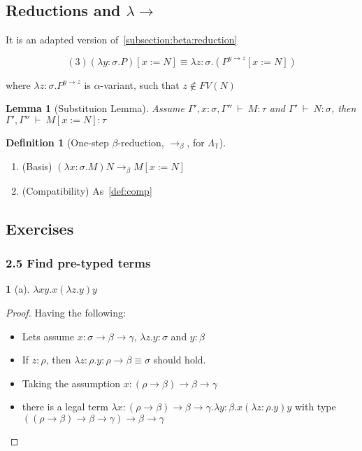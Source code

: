 \documentclass[12pt, a4paper]{article}
\newcommand{\onebeta}{\to_\beta}
\newcommand{\deriv}{\ \vdash\ }
\newtheorem{definition}{Definition}[section]
\newtheorem{lemma}{Lemma}[section]
\newtheorem*{exercise}{}
\begin{document}
\subsection{Reductions and \texorpdfstring{$\lambda\to$}{Lg}}
It is an adapted version of~\ref{subsection:beta:reduction}

\begin{equation}
    (3) (\lambda y : \sigma . P)[x := N] \equiv \lambda z : \sigma . (P^{y \to z}[x := N])
\end{equation}

where $\lambda z : \sigma. P^{y \to z}$ is $\alpha$-variant, such that $z \notin FV(N)$

\begin{lemma}[Substituion Lemma]
    Assume $\Gamma', x : \sigma, \Gamma'' \deriv M : \tau$ and $\Gamma' \deriv N : \sigma$, then $\Gamma', \Gamma'' \deriv M[x := N] : \tau$
\end{lemma}

\begin{definition}[One-step $\beta$-reduction, $\onebeta$, for $\Lambda_{\mathbb{T}}$]
\end{definition}
\begin{enumerate}
    \item (Basis) $(\lambda x : \sigma . M)N \onebeta M [x := N]$
    \item (Compatibility) As~\ref{def:comp}
\end{enumerate}

\subsection{Exercises}
\subsubsection{2.5 Find pre-typed terms}
\begin{exercise}[a]
    $\lambda xy. x(\lambda z. y)y$
\end{exercise}
\begin{proof}
    Having the following:
    \begin{itemize}
        \item Lets assume $x : \sigma \to \beta \to \gamma$, $\lambda z. y : \sigma$ and $y : \beta$
        \item If $z : \rho$, then $\lambda z : \rho. y : \rho \to \beta \equiv \sigma$ should hold.
        \item Taking the assumption $x : (\rho \to \beta) \to \beta \to \gamma$ 
        \item there is a legal term $\lambda x: (\rho \to \beta) \to \beta \to \gamma. \lambda y : \beta. x(\lambda z : \rho . y)y$ with type $((\rho \to \beta) \to \beta \to \gamma) \to \beta \to \gamma$
    \end{itemize}
\end{proof}
\end{document}
